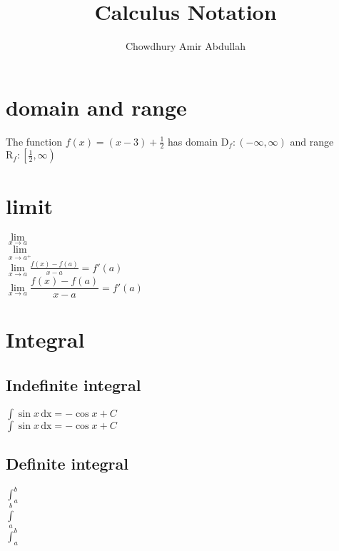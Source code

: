 \documentclass[11pt, a4paper]{article}
\author{Chowdhury Amir Abdullah}
\title{Calculus Notation}
\begin{document}
\maketitle

\section{domain and range}

The function $ f(x) = (x-3) + \frac{1}{2} $ has domain $ \mathrm{D}_f: (-\infty, \infty) $ and range $  \mathrm{R}_f: \left [ \frac{1}{2}, \infty \right) $ \\

\section{limit}

$ \lim \limits_{x \to a} $ \\

$ \lim \limits_{x \to a^+} $ \\

$ \lim \limits_{x \to a} \frac{f(x)-f(a)}{x-a} = f'(a)  $ \\

$ \lim \limits_{x \to a} \dfrac{f(x)-f(a)}{x-a} = f'(a)  $ \\

\section{Integral}

\subsection{Indefinite integral }
$ \int \sin x \, \mathrm{dx} = - \cos x + C $ \\

$ \displaystyle{ \int \sin x \, \mathrm{dx} = - \cos x + C }$ \\

\subsection{Definite integral}

$ \int_a^b  $ \\

$ \int \limits_a^b $ \\

$ \displaystyle{ \int_a^b } $ \\
\end{document}
